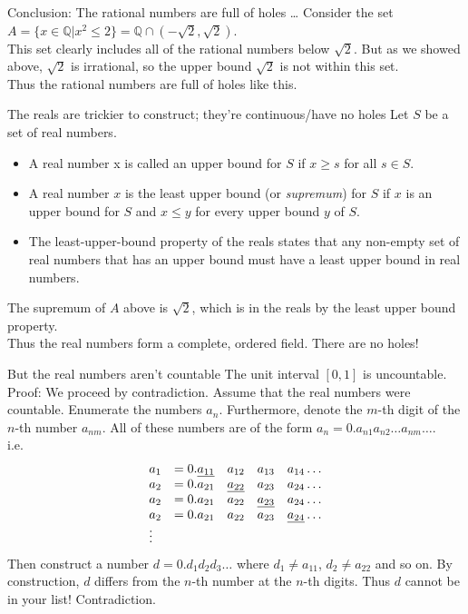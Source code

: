 \documentclass{beamer}
\begin{document}
\begin{frame}{Conclusion: The rational numbers are full of holes \ldots}
Consider the set\\
$A = \{ x \in \mathbb{Q} | x^2 \leq 2 \} = \mathbb{Q} \cap (-\sqrt{2}, \sqrt{2})$.\\
This set clearly includes all of the rational numbers below $\sqrt{2}$. But as we showed above, $\sqrt{2}$
is irrational, so the upper bound $\sqrt{2}$ is not within this set.\\
Thus the rational numbers are full of holes like this.
\end{frame}

\begin{frame}{The reals are trickier to construct; they're continuous/have no holes}
Let $S$ be a set of real numbers.
\begin{itemize}
\item A real number x is called an upper bound for $S$ if $x \geq s$ for all $s \in S$. \\
\item A real number $x$ is the least upper bound (or \emph{supremum}) for $S$ if $x$ is an upper bound for $S$ and $x \leq y$ for every upper bound $y$ of $S$.\\
\item The least-upper-bound property of the reals states that any non-empty set of real numbers that has an upper bound must have a least upper bound in real numbers.
\end{itemize}
The supremum of $A$ above is $\sqrt{2}$, which is in the reals by the least upper bound property.\\
Thus the real numbers form a complete, ordered field. There are no holes!
\end{frame}

\begin{frame}{But the real numbers aren't countable}
The unit interval $[0, 1]$ is uncountable. \\
Proof:
We proceed by contradiction. Assume that the real numbers were countable.
Enumerate the numbers $a_n$. Furthermore, denote the $m$-th digit of the $n$-th number $a_{nm}.$
All of these numbers are of the form $a_n = 0.a_{n1} a_{n2} \ldots a_{nm} \ldots$.
\\
i.e.
\begin{equation*}
\begin{array}{llllll}
a_{1} &= 0.\emph{a_{11}} &a_{12} &a_{13} &a_{14} \ldots \\
a_{2} &= 0.a_{21} &\emph{a_{22}} &a_{23} &a_{24} \ldots \\
a_{2} &= 0.a_{21} &a_{22} &\emph{a_{23}} &a_{24} \ldots \\
a_{2} &= 0.a_{21} &a_{22} &a_{23} &\emph{a_{24}} \ldots \\
\vdots
\end{array}
\end{equation*}
Then construct a number $d = 0.d_1 d_2 d_3 \ldots$ where $d_1 \ne a_{11}$, $d_2 \ne a_{22}$ and
so on. By construction, $d$ differs from the $n$-th number at the $n$-th digits. Thus $d$ cannot be in your
list! Contradiction.
\end{frame}
\end{document}
